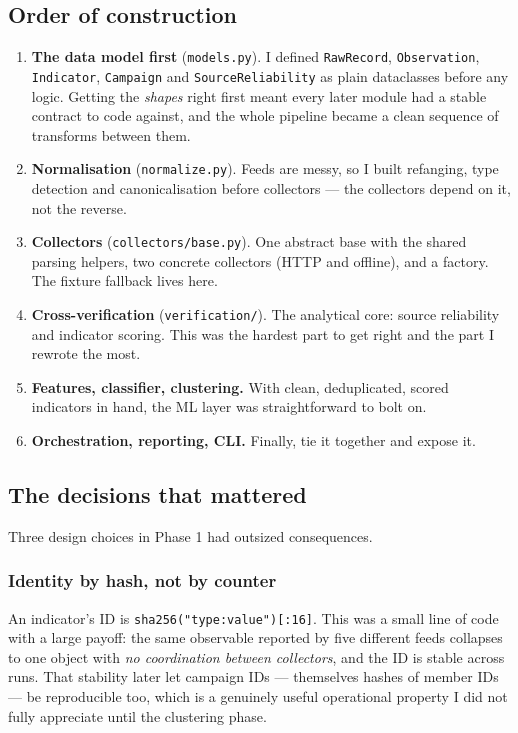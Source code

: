 \documentclass[11pt,a4paper]{article}
\newcommand{\code}[1]{\texttt{\small #1}}
\begin{document}
\subsection{Order of construction}
\begin{enumerate}[leftmargin=1.4em,itemsep=3pt]
  \item \textbf{The data model first} (\code{models.py}). I defined
    \code{RawRecord}, \code{Observation}, \code{Indicator}, \code{Campaign} and
    \code{SourceReliability} as plain dataclasses before any logic. Getting the
    \emph{shapes} right first meant every later module had a stable contract to
    code against, and the whole pipeline became a clean sequence of transforms
    between them.
  \item \textbf{Normalisation} (\code{normalize.py}). Feeds are messy, so I
    built refanging, type detection and canonicalisation before collectors ---
    the collectors depend on it, not the reverse.
  \item \textbf{Collectors} (\code{collectors/base.py}). One abstract base with
    the shared parsing helpers, two concrete collectors (HTTP and offline), and
    a factory. The fixture fallback lives here.
  \item \textbf{Cross-verification} (\code{verification/}). The analytical
    core: source reliability and indicator scoring. This was the hardest part to
    get right and the part I rewrote the most.
  \item \textbf{Features, classifier, clustering.} With clean, deduplicated,
    scored indicators in hand, the ML layer was straightforward to bolt on.
  \item \textbf{Orchestration, reporting, CLI.} Finally, tie it together and
    expose it.
\end{enumerate}

\subsection{The decisions that mattered}
Three design choices in Phase 1 had outsized consequences.

\subsubsection{Identity by hash, not by counter}
An indicator's ID is \code{sha256("type:value")[:16]}. This was a small line of
code with a large payoff: the same observable reported by five different feeds
collapses to one object with \emph{no coordination between collectors}, and the
ID is stable across runs. That stability later let campaign IDs --- themselves
hashes of member IDs --- be reproducible too, which is a genuinely useful
operational property I did not fully appreciate until the clustering phase.
\end{document}
